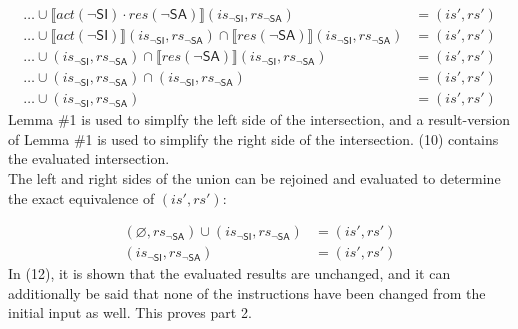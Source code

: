 \documentclass[12pt, letterpaper]{article}
\let\emptyset\varnothing
\newcommand\interp[1]{\llbracket #1 \rrbracket}
\begin{document}
 {\fontsize{10pt}{12pt}\selectfont
 \begin{align}
     \ldots \cup %
     \interp{ \mathit{act}(\neg\mathsf{SI}) \cdot
      \mathit{res}(\neg\mathsf{SA}) } (\mathit{is_{\mathsf{\neg SI}}}, \mathit{rs_{\mathsf{\neg SA}}})
     &=
     (\mathit{is}', \mathit{rs}')
     \\
     \ldots \cup %
     \interp{ \mathit{act}(\neg\mathsf{SI}) } (\mathit{is_{\mathsf{\neg SI}}}, \mathit{rs_{\mathsf{\neg SA}}}) \cap
     \interp{ \mathit{res}(\neg\mathsf{SA}) } (\mathit{is_{\mathsf{\neg SI}}}, \mathit{rs_{\mathsf{\neg SA}}})
     &=
     (\mathit{is}', \mathit{rs}')
     \\
     \ldots \cup %
     (\mathit{is_{\mathsf{\neg SI}}}, \mathit{rs_{\mathsf{\neg SA}}}) \cap
     \interp{ \mathit{res}(\neg\mathsf{SA}) } (\mathit{is_{\mathsf{\neg SI}}}, \mathit{rs_{\mathsf{\neg SA}}})
     &=
     (\mathit{is}', \mathit{rs}')
     \\
     \ldots \cup %
     (\mathit{is_{\mathsf{\neg SI}}}, \mathit{rs_{\mathsf{\neg SA}}}) \cap
     (\mathit{is_{\mathsf{\neg SI}}}, \mathit{rs_{\mathsf{\neg SA}}})
     &=
     (\mathit{is}', \mathit{rs}')
     \\
     \ldots \cup %
     (\mathit{is_{\mathsf{\neg SI}}}, \mathit{rs_{\mathsf{\neg SA}}})
     &=
     (\mathit{is}', \mathit{rs}')
 \end{align}
 }%
     Lemma \#1 is used to simplfy the left side of the intersection, and a result-version of Lemma \#1 is used to simplify the right side of the intersection. (10) contains the evaluated intersection.\\
     The left and right sides of the union can be rejoined and evaluated to determine the exact equivalence of $(\mathit{is}', \mathit{rs}')$:
 \par\nobreak
 {\fontsize{10pt}{12pt}\selectfont
 \begin{align}
     (\emptyset, \mathit{rs_{\mathsf{\neg SA}}}) \cup
     (\mathit{is_{\mathsf{\neg SI}}}, \mathit{rs_{\mathsf{\neg SA}}})
     &=
     (\mathit{is}', \mathit{rs}')
     \\
     (\mathit{is_{\mathsf{\neg SI}}}, \mathit{rs_{\mathsf{\neg SA}}})
     &=
     (\mathit{is}', \mathit{rs}')
 \end{align}
 }%
     In (12), it is shown that the evaluated results are unchanged, and it can additionally be said that none of the instructions have been changed from the initial input as well.  This proves part 2.
\end{document}
